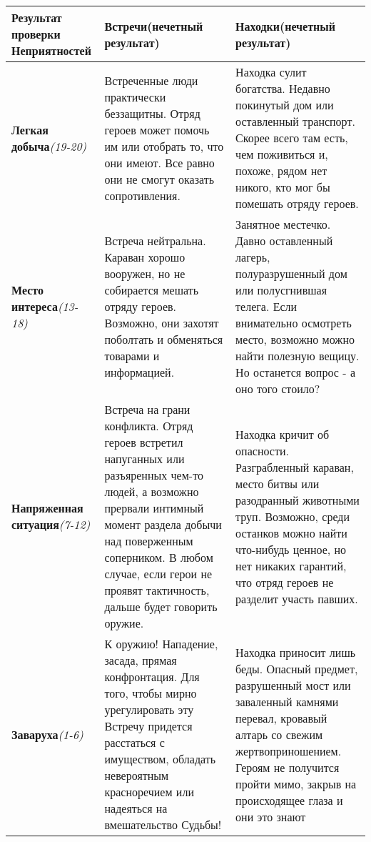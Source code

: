 \begin{center}
\begin{tabular}{|p{3cm}|p{6.5cm}|p{6.5cm}|}
\hline
\textbf{Результат проверки Неприятностей} & \textbf{Встречи(нечетный результат)} & \textbf{Находки(нечетный результат)}
\\ \hline
\textbf{Легкая добыча}\newline\textit{(19-20)} & Встреченные люди практически беззащитны. Отряд героев может помочь им или отобрать то, что они имеют. Все равно они не смогут оказать сопротивления. & Находка сулит богатства. Недавно покинутый дом или оставленный транспорт. Скорее всего там есть, чем поживиться и, похоже, рядом нет никого, кто мог бы помешать отряду героев.
\\ \hline
\textbf{Место интереса}\newline\textit{(13-18)} & Встреча нейтральна. Караван хорошо вооружен, но не собирается мешать отряду героев. Возможно, они захотят поболтать и обменяться товарами и информацией. & Занятное местечко. Давно оставленный лагерь, полуразрушенный дом или полусгнившая телега. Если внимательно осмотреть место, возможно можно найти полезную вещицу. Но останется вопрос - а оно того стоило?
\\ \hline
\textbf{Напряженная ситуация}\newline\textit{(7-12)} & Встреча на грани конфликта. Отряд героев встретил напуганных или разъяренных чем-то людей, а возможно прервали интимный момент раздела добычи над поверженным соперником. В любом случае, если герои не проявят тактичность, дальше будет говорить оружие. & Находка кричит об опасности. Разграбленный караван, место битвы или разодранный животными труп. Возможно, среди останков можно найти что-нибудь ценное, но нет никаких гарантий, что отряд героев не разделит участь павших.
\\ \hline
\textbf{Заваруха}\newline\textit{(1-6)} & К оружию! Нападение, засада, прямая конфронтация. Для того, чтобы мирно урегулировать эту Встречу придется расстаться с имуществом, обладать невероятным красноречием или надеяться на вмешательство Судьбы! & Находка приносит лишь беды. Опасный предмет, разрушенный мост или заваленный камнями перевал, кровавый алтарь со свежим жертвоприношением. Героям не получится пройти мимо, закрыв на происходящее глаза и они это знают
\\ \hline
\end{tabular}
\end{center}
